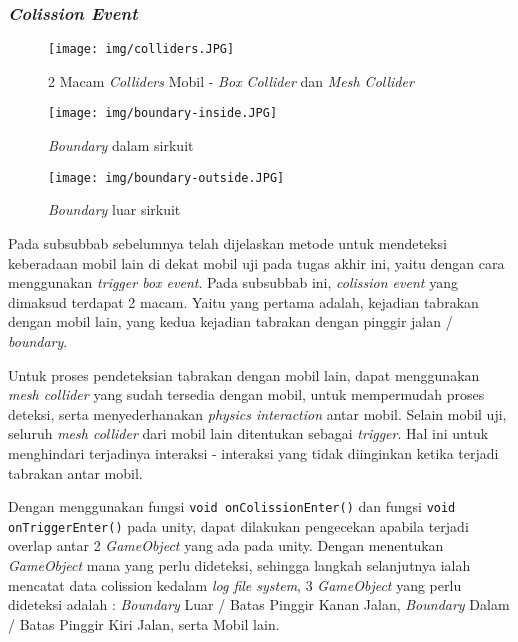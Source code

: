         \subsubsection{\textit{Colission Event}}
        
        \begin{figure}  [!htb]
	        \captionsetup{justification=centering}
	        \texttt{[image: img/colliders.JPG]}
	        \caption{2 Macam \textit{Colliders} Mobil - \textit{Box Collider} dan \textit{Mesh Collider}}
	        \label{fig: 3_22}
        \end{figure}
        
        \begin{figure}  [!htb]
	        \captionsetup{justification=centering}
	        \texttt{[image: img/boundary-inside.JPG]}
	        \caption{\textit{Boundary} dalam sirkuit}
	        \label{fig: 3_23}
        \end{figure}
        
        \begin{figure}  [!htb]
	        \captionsetup{justification=centering}
	        \texttt{[image: img/boundary-outside.JPG]}
	        \caption{\textit{Boundary} luar sirkuit}
	        \label{fig: 3_24}
        \end{figure}
        
         Pada subsubbab sebelumnya telah dijelaskan metode untuk mendeteksi keberadaan mobil lain di dekat mobil uji pada tugas akhir ini, yaitu dengan cara menggunakan \textit{trigger box event}. Pada subsubbab ini, \textit{colission event} yang dimaksud terdapat 2 macam. Yaitu yang pertama adalah, kejadian tabrakan dengan mobil lain, yang kedua kejadian tabrakan dengan pinggir jalan / \textit{boundary}. 
         
         \par Untuk proses pendeteksian tabrakan dengan mobil lain, dapat menggunakan \textit{mesh collider} yang sudah tersedia dengan mobil, untuk mempermudah proses deteksi, serta menyederhanakan \textit{physics interaction} antar mobil. Selain mobil uji, seluruh \textit{mesh collider} dari mobil lain ditentukan sebagai \textit{trigger}. Hal ini untuk menghindari terjadinya interaksi - interaksi yang tidak diinginkan ketika terjadi tabrakan antar mobil. 
         
         \par Dengan menggunakan fungsi \texttt{void onColissionEnter()} dan fungsi \texttt{void onTriggerEnter()} pada unity, dapat dilakukan pengecekan apabila terjadi overlap antar 2 \textit{GameObject} yang ada pada unity. Dengan menentukan \textit{GameObject} mana yang perlu dideteksi, sehingga langkah selanjutnya ialah mencatat data colission kedalam \textit{log file system}, 3 \textit{GameObject} yang perlu dideteksi adalah : \textit{Boundary} Luar / Batas Pinggir Kanan Jalan, \textit{Boundary} Dalam / Batas Pinggir Kiri Jalan, serta Mobil lain.
         
